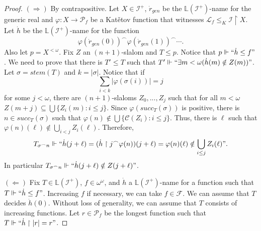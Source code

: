 \documentclass{amsart}
\theoremstyle{definition}
\theoremstyle{remark}
\numberwithin{equation}{section}
\newcommand{\li}{\mathbb{L}(\mathcal{I}^+)}
\newcommand{\id}{\mathcal{I}}
\begin{document}
\begin{proof}
$(\Rightarrow)$ By contrapositive. Let $X\in \id^+$, $\dot r_{gen}$ be the $\li$-name for the generic real and $\varphi:X\rightarrow \mathcal{P}_f$ be a Kat\v{e}tov function that witnesses $\mathcal{L}_f\leq_{K}\id\upharpoonright X$. Let $\dot h$ be the $\li$-name for the function
\[
\varphi(\dot r_{gen}(0))^{\frown}\varphi(\dot r_{gen}(1))^{\frown}\cdots.
\]
Also let $p=X^{<\omega}$. Fix $Z$ an $(n+1)$-slalom and $T\leq p$. Notice that $p\Vdash``\dot h\leq f"$. We need to prove that there is $T'\leq T$ such that $T'\Vdash``\exists m<\omega (\dot h(m)\notin Z(m))"$. Let $\sigma =stem (T)$ and $k=|\sigma|$. Notice that if 
\begin{displaymath}
\sum_{i<k}|\varphi(\sigma(i))|=j
\end{displaymath}
for some $j<\omega$, there are  $(n+1)$-slaloms $Z_0,...,Z_j$ such that for all $ m<\omega$ $Z(m+j)\subseteq \bigcup \{Z_i(m):i\leq j\}$. Since $\varphi(succ_T(\sigma))$ is positive, there is $n\in succ_T(\sigma)$ such that $\varphi(n)\notin \bigcup \{\mathcal{C}(Z_i):i\leq j\}$. Thus, there is $\ell$ such that $\varphi(n)(\ell)\notin \bigcup_{i<j}Z_i(\ell)$. Therefore,
\begin{displaymath}
    T_{\sigma^\frown n}\Vdash `` \dot h(j+\ell)=(\dot h\upharpoonright j ^\frown \varphi(n))(j+\ell)=\varphi(n)(\ell)\notin \bigcup_{i\leq j}Z_i(\ell)".
\end{displaymath}   
In particular $T_{\sigma^\frown n}\Vdash `` \dot h(j+\ell)\notin Z(j+\ell)"$.


$(\Leftarrow)$ Fix $T\in \li$, $f\in\omega^{\omega}$, and $\dot h$ a $\li$-name for a function such that $T\Vdash``\dot h\leq f"$. Increasing $f$ if necessary, we can take $f\in\mathcal{F}$. We can assume that $T$ decides $\dot h(0)$. Without loss of generality, we can assume that $T$ consists of increasing functions. Let $r\in\mathcal{P}_f$ be the longest function such that $T\Vdash`` \dot h\upharpoonright|r|=r"$.


\end{proof}
\end{document}
